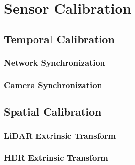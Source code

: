 \documentclass{erauthesis}
\begin{document}
\section{Sensor Calibration} \label{sec:calibration}


\subsection{Temporal Calibration}\label{time_sync}


\subsubsection{Network Synchronization} \label{time_sync_lan}


\subsubsection{Camera Synchronization} \label{time_sync_cam}


\subsection{Spatial Calibration} \label{spatial_calibration}

\subsubsection{LiDAR Extrinsic Transform} \label{lidar_extrinsic}

\subsubsection{HDR Extrinsic Transform} \label{HDR_extrinsic}
\end{document}
